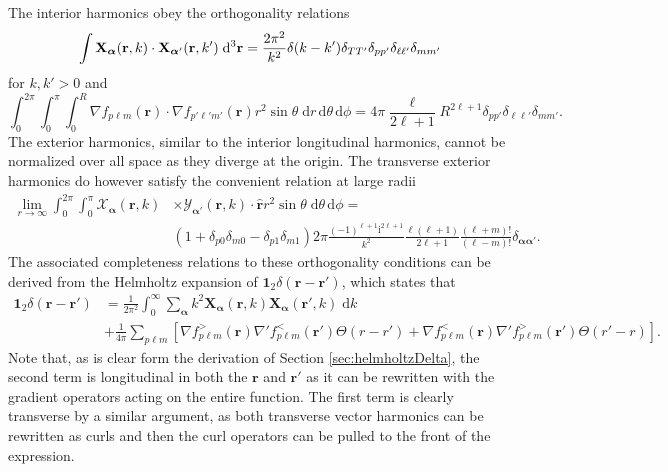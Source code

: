 \documentclass{article}
\numberwithin{equation}{section}
\begin{document}
The interior harmonics obey the orthogonality relations
\begin{equation}\label{eq:orthogonality}
\int \mathbf{X}_{\bm{\alpha}}(\mathbf{r},k)\cdot\mathbf{X}_{\bm{\alpha}'}(\mathbf{r},k')\;\mathrm{d}^3\mathbf{r} = \frac{2\pi^2}{k^2}\delta(k - k')\delta_{TT'}\delta_{pp'}\delta_{\ell\ell'}\delta_{mm'}\\
\end{equation}
for $k,k' > 0$ and
\begin{equation}
\int_0^{2\pi}\int_0^\pi\int_0^R\nabla f_{p\ell m}(\mathbf{r})\cdot\nabla f_{p'\ell'm'}(\mathbf{r})r^2\sin\theta\;\mathrm{d}r\,\mathrm{d}\theta\,\mathrm{d}\phi = 4\pi\frac{\ell}{2\ell + 1}R^{2\ell + 1}\delta_{pp'}\delta_{\ell\ell'}\delta_{mm'}.
\end{equation}
The exterior harmonics, similar to the interior longitudinal harmonics, cannot be normalized over all space as they diverge at the origin. The transverse exterior harmonics do however satisfy the convenient relation at large radii
\begin{equation}
\begin{split}
\lim_{r\to\infty}\int_0^{2\pi}\int_0^\pi \bm{\mathcal{X}}_{\bm{\alpha}}(\mathbf{r},k)&\times\bm{\mathcal{Y}}_{\bm{\alpha}'}(\mathbf{r},k)\cdot\hat{\mathbf{r}}r^2\sin\theta\;\mathrm{d}\theta\,\mathrm{d}\phi = \\
&(1 + \delta_{p0}\delta_{m0} - \delta_{p1}\delta_{m1})2\pi\frac{(-1)^{\ell + 1}\mathrm{i}^{2\ell + 1}}{k^2}\frac{\ell(\ell + 1)}{2\ell + 1}\frac{(\ell + m)!}{(\ell - m)!}\delta_{\bm{\alpha}\bm{\alpha}'}.
\end{split}
\end{equation}
The associated completeness relations to these orthogonality conditions can be derived from the Helmholtz expansion of $\bm{1}_2\delta(\mathbf{r} - \mathbf{r}')$, which states that 
\begin{equation}
\begin{split}
\bm{1}_2\delta(\mathbf{r} - \mathbf{r}') &= \frac{1}{2\pi^2}\int_0^\infty\sum_{\bm{\alpha}}k^2\mathbf{X}_{\bm{\alpha}}(\mathbf{r},k)\mathbf{X}_{\bm{\alpha}}(\mathbf{r}',k)\;\mathrm{d}k\\
&+ \frac{1}{4\pi}\sum_{p\ell m}\left[\nabla f_{p\ell m}^>(\mathbf{r})\nabla'f_{p\ell m}^<(\mathbf{r}')\Theta(r - r') + \nabla f_{p\ell m}^<(\mathbf{r})\nabla'f_{p\ell m}^>(\mathbf{r}')\Theta(r' - r)\right].
\end{split}
\end{equation}
Note that, as is clear form the derivation of Section \ref{sec:helmholtzDelta}, the second term is longitudinal in both the $\mathbf{r}$ and $\mathbf{r}'$ as it can be rewritten with the gradient operators acting on the entire function. The first term is clearly transverse by a similar argument, as both transverse vector harmonics can be rewritten as curls and then the curl operators can be pulled to the front of the expression.
\end{document}
